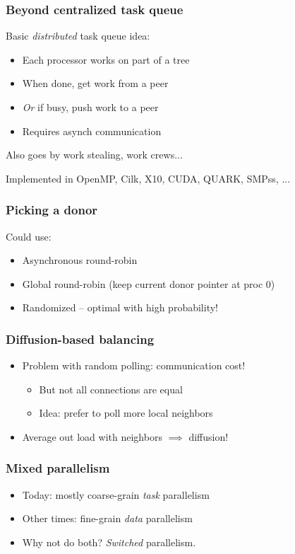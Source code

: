 \documentclass{beamer}
\begin{document}
\begin{frame}
  \frametitle{Beyond centralized task queue}
  
  Basic {\em distributed} task queue idea:
  \begin{itemize}
  \item Each processor works on part of a tree
  \item When done, get work from a peer
  \item {\em Or} if busy, push work to a peer
  \item Requires asynch communication
  \end{itemize}
  Also goes by work stealing, work crews...
  
  \vspace{5mm}
  Implemented in OpenMP, Cilk, X10, CUDA, QUARK, SMPss, ...
\end{frame}


\begin{frame}
  \frametitle{Picking a donor}

  Could use:
  \begin{itemize}
  \item Asynchronous round-robin
  \item Global round-robin (keep current donor pointer at proc 0)
  \item Randomized -- optimal with high probability!
  \end{itemize}

\end{frame}


\begin{frame}
  \frametitle{Diffusion-based balancing}

  \begin{itemize}
  \item Problem with random polling: communication cost!
    \begin{itemize}
    \item But not all connections are equal
    \item Idea: prefer to poll more local neighbors
    \end{itemize}
  \item Average out load with neighbors $\implies$ diffusion!
  \end{itemize}
\end{frame}


\begin{frame}
  \frametitle{Mixed parallelism}

  \begin{itemize}
  \item Today: mostly coarse-grain {\em task} parallelism
  \item Other times: fine-grain {\em data} parallelism
  \item Why not do both?  {\em Switched} parallelism.
  \end{itemize}
\end{frame}
\end{document}
